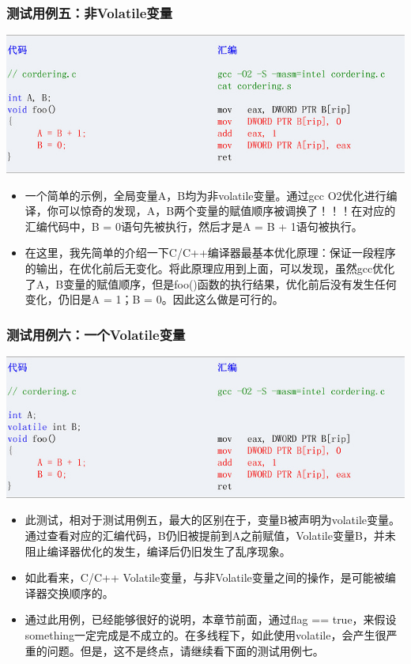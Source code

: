 \documentclass[9pt,b5paper]{article}
\begin{document}
\subsubsection{测试用例五：非Volatile变量}
\label{sec-8-3-1}
\includegraphics[width=.9\linewidth]{../pic/v6.jpg}
\begin{itemize}
\item 一个简单的示例，全局变量A，B均为非volatile变量。通过gcc O2优化进行编译，你可以惊奇的发现，A，B两个变量的赋值顺序被调换了！！！在对应的汇编代码中，B = 0语句先被执行，然后才是A = B + 1语句被执行。
\item 在这里，我先简单的介绍一下C/C++编译器最基本优化原理：保证一段程序的输出，在优化前后无变化。将此原理应用到上面，可以发现，虽然gcc优化了A，B变量的赋值顺序，但是foo()函数的执行结果，优化前后没有发生任何变化，仍旧是A = 1；B = 0。因此这么做是可行的。
\end{itemize}
\subsubsection{测试用例六：一个Volatile变量}
\label{sec-8-3-2}
\includegraphics[width=.9\linewidth]{../pic/v7.jpg}
\begin{itemize}
\item 此测试，相对于测试用例五，最大的区别在于，变量B被声明为volatile变量。通过查看对应的汇编代码，B仍旧被提前到A之前赋值，Volatile变量B，并未阻止编译器优化的发生，编译后仍旧发生了乱序现象。
\item 如此看来，C/C++ Volatile变量，与非Volatile变量之间的操作，是可能被编译器交换顺序的。
\item 通过此用例，已经能够很好的说明，本章节前面，通过flag == true，来假设something一定完成是不成立的。在多线程下，如此使用volatile，会产生很严重的问题。但是，这不是终点，请继续看下面的测试用例七。
\end{itemize}
\end{document}

